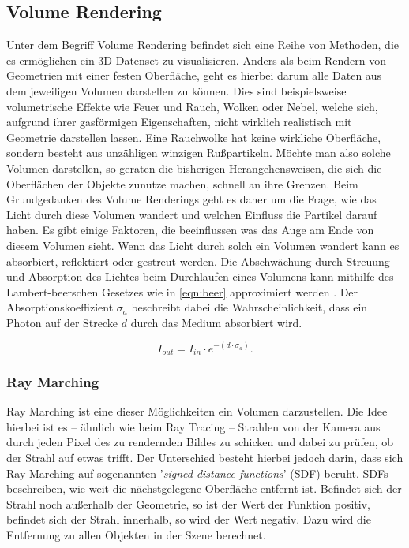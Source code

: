 \newpage
\subsection{Volume Rendering}

Unter dem Begriff Volume Rendering befindet sich eine Reihe von Methoden, die es ermöglichen ein 3D-Datenset zu visualisieren.
Anders als beim Rendern von Geometrien mit einer festen Oberfläche, geht es hierbei darum alle Daten aus
dem jeweiligen Volumen darstellen zu können. Dies sind beispielsweise volumetrische Effekte wie Feuer und Rauch, Wolken oder Nebel,
welche sich, aufgrund ihrer gasförmigen Eigenschaften, nicht wirklich realistisch mit Geometrie darstellen lassen.
Eine Rauchwolke hat keine wirkliche Oberfläche, sondern besteht aus unzähligen winzigen Rußpartikeln.
Möchte man also solche Volumen darstellen, so geraten die bisherigen Herangehensweisen, die sich die Oberflächen der Objekte zunutze machen,
schnell an ihre Grenzen. Beim Grundgedanken des Volume Renderings geht es daher um die Frage, wie das Licht durch diese Volumen
wandert und welchen Einfluss die Partikel darauf haben.
Es gibt einige Faktoren, die beeinflussen was das Auge am Ende von diesem Volumen sieht. Wenn das Licht durch solch ein Volumen wandert
kann es absorbiert, reflektiert oder gestreut werden.
Die Abschwächung durch Streuung und Absorption des Lichtes beim Durchlaufen eines Volumens kann mithilfe des Lambert-beerschen Gesetzes wie in \ref{eqn:beer} 
approximiert werden \parencite{Mayerhofer2020}. 
Der Absorptionskoeffizient $\sigma_a$ beschreibt dabei die Wahrscheinlichkeit, dass ein Photon auf der Strecke $d$ durch das Medium absorbiert wird. 

\vspace{-0.5cm  }
\begin{equation} 
    \label{eqn:beer}
    I_{out} = I_{in} \cdot e^{- ( d \cdot\sigma_a  )}.
\end{equation}




\subsubsection{Ray Marching}

Ray Marching ist eine dieser Möglichkeiten ein Volumen darzustellen. Die Idee hierbei ist es – ähnlich wie beim Ray Tracing – 
Strahlen von der Kamera aus durch jeden Pixel des zu rendernden Bildes zu schicken und dabei zu prüfen, ob der Strahl auf etwas trifft.
Der Unterschied besteht hierbei jedoch darin, dass sich Ray Marching auf sogenannten '\textit{signed distance functions}' (SDF) beruht.
SDFs beschreiben, wie weit die nächstgelegene Oberfläche entfernt ist. Befindet sich der Strahl noch außerhalb der Geometrie, so ist 
der Wert der Funktion positiv, befindet sich der Strahl innerhalb, so wird der Wert negativ. Dazu wird die Entfernung zu allen Objekten 
in der Szene berechnet.

